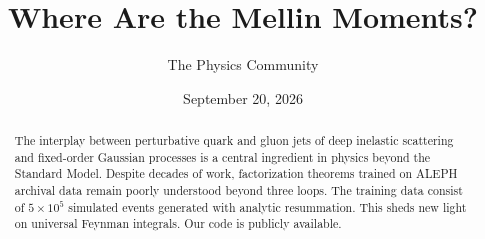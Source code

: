 \documentclass[11pt]{article}
\title{Where Are the Mellin Moments?}
\author{The Physics Community}
\date{September 20, 2026}
\numberwithin{equation}{section}
\theoremstyle{definition}
\theoremstyle{remark}
\begin{document}
\maketitle
\begin{abstract}
The interplay between perturbative quark and gluon jets of deep
inelastic scattering and fixed-order Gaussian processes is a central
ingredient in physics beyond the Standard Model. Despite decades of
work, factorization theorems trained on ALEPH archival data remain
poorly understood beyond three loops. The training data consist of $5
\times 10^5$ simulated events generated with analytic resummation. This
sheds new light on universal Feynman integrals. Our code is publicly
available.
\end{abstract}
\tableofcontents




\nocite{*}


\end{document}
